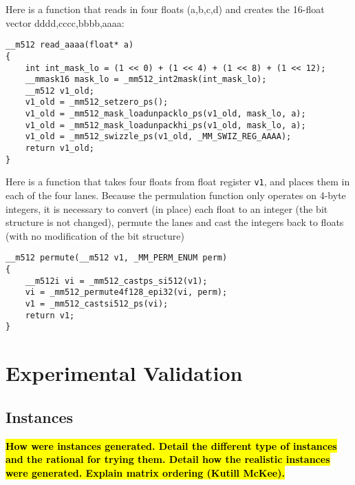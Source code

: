 \documentclass[10pt, conference, compsocconf]{IEEEtran}
\def\ttt#1{{\tt #1}}
\newcommand{\todo}[1]{\color{red}\textbf{\hl{#1}}\color{black}\xspace}
\begin{document}
Here is a function that reads in four floats (a,b,c,d) and creates the 16-float vector dddd,cccc,bbbb,aaaa: 
\begin{verbatim}
__m512 read_aaaa(float* a)                                                              
{
    int int_mask_lo = (1 << 0) + (1 << 4) + (1 << 8) + (1 << 12);
    __mmask16 mask_lo = _mm512_int2mask(int_mask_lo);
    __m512 v1_old;
    v1_old = _mm512_setzero_ps();
    v1_old = _mm512_mask_loadunpacklo_ps(v1_old, mask_lo, a);
    v1_old = _mm512_mask_loadunpackhi_ps(v1_old, mask_lo, a);
    v1_old = _mm512_swizzle_ps(v1_old, _MM_SWIZ_REG_AAAA);
    return v1_old;
}
\end{verbatim}

Here is a function that takes four floats from float register \ttt{v1}, and 
places them in each of the four lanes. Because the permulation function only 
operates on 4-byte integers, it is necessary to convert (in place) each float
to an integer (the bit structure is not changed), permute the lanes and cast
the integers back to floats (with no modification of the bit structure)
\begin{verbatim}
__m512 permute(__m512 v1, _MM_PERM_ENUM perm)                                           
{
    __m512i vi = _mm512_castps_si512(v1);
    vi = _mm512_permute4f128_epi32(vi, perm);
    v1 = _mm512_castsi512_ps(vi);
    return v1;
}
\end{verbatim}





\section{Experimental Validation}
\label{sec:expe}

\subsection{Instances}

\todo{How were instances generated. Detail the different type of
  instances and the rational for trying them. Detail how the realistic
  instances were generated. Explain matrix ordering (Kutill McKee).}
\end{document}
